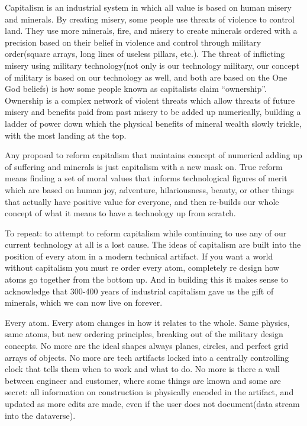 Capitalism is an industrial system in which all value is based on human
misery and minerals. By creating misery, some people use threats of
violence to control land. They use more minerals, fire, and misery to
create minerals ordered with a precision based on their belief in
violence and control through military order(square arrays, long lines of
useless pillars, etc.). The threat of inflicting misery using military
technology(not only is our technology military, our concept of military
is based on our technology as well, and both are based on the One God
beliefs) is how some people known as capitalists claim ``ownership''.
Ownership is a complex network of violent threats which allow threats of
future misery and benefits paid from past misery to be added up
numerically, building a ladder of power down which the physical benefits
of mineral wealth slowly trickle, with the most landing at the top.

Any proposal to reform capitalism that maintains concept of numerical
adding up of suffering and minerals is just capitalism with a new mask
on. True reform means finding a set of moral values that informs
technological figures of merit which are based on human joy, adventure,
hilariousness, beauty, or other things that actually have positive value
for everyone, and then re-builds our whole concept of what it means to
have a technology up from scratch.

To repeat: to attempt to reform capitalism while continuing to use any
of our current technology at all is a lost cause. The ideas of
capitalism are built into the position of every atom in a modern
technical artifact. If you want a world without capitalism you must re
order every atom, completely re design how atoms go together from the
bottom up. And in building this it makes sense to acknowledge that
300-400 years of industrial capitalism gave us the gift of minerals,
which we can now live on forever.

Every atom. Every atom changes in how it relates to the whole. Same
physics, same atoms, but new ordering principles, breaking out of the
military design concepts. No more are the ideal shapes always planes,
circles, and perfect grid arrays of objects. No more are tech artifacts
locked into a centrally controlling clock that tells them when to work
and what to do. No more is there a wall between engineer and customer,
where some things are known and some are secret: all information on
construction is physically encoded in the artifact, and updated as more
edits are made, even if the user does not document(data stream into the
dataverse).

